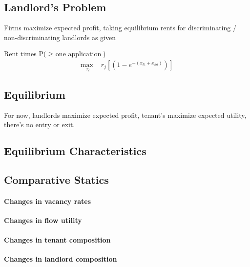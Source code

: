 \documentclass{article}
\begin{document}


\subsection{Landlord's Problem}
Firms maximize expected profit, taking equilibrium rents for discriminating / non-discriminating landlords as given

Rent times P($\geq\text{ one application}$)
\begin{align*}
    \underset{r_l}{\text{max }} & r_j[(1 - e^{-(x_{la}+x_{ha})})]
\end{align*}



\subsection{Equilibrium}

For now, landlords maximize expected profit, tenant's maximize expected utility, there's no entry or exit.

\subsection{Equilibrium Characteristics}


\subsection{Comparative Statics}
\paragraph{Changes in vacancy rates}

\paragraph{Changes in flow utility}

\paragraph{Changes in tenant composition}

\paragraph{Changes in landlord composition}
\end{document}
